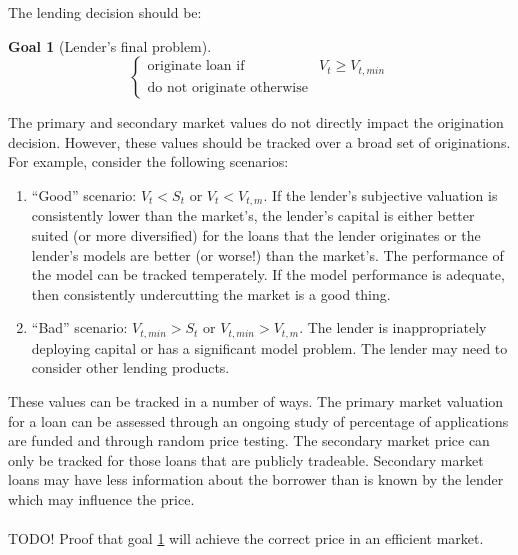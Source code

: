 \documentclass{article}
\theoremstyle{definition}
\newtheorem{goal}{Goal}
\begin{document}
The lending decision should be:


\begin{goal}[Lender's final problem] \label{lender3}
	\[
	\left\{
	\begin{array}{ll}
	\text{originate loan if} & V_t \geq V_{t, min}\\
	\text{do not originate otherwise} 
	\end{array} \right.
	\]
	
\end{goal}

The primary and secondary market values do not directly impact the origination decision.  However, these values should be tracked over a broad set of originations.  For example, consider the following scenarios:

\begin{enumerate}
	\item ``Good'' scenario:  \(V_t<S_t\) or \(V_t<V_{t, m}\).  If the lender's subjective valuation is consistently lower than the market's, the lender's capital is either better suited (or more diversified) for the loans that the lender originates or the lender's models are better (or worse!) than the market's.  The performance of the model can be tracked temperately.  If the model performance is adequate, then consistently undercutting the  market is a good thing.  
	\item ``Bad'' scenario: \(V_{t, min}>S_t\) or \(V_{t, min}>V_{t, m}\).  The lender is inappropriately deploying capital or has a significant model problem.  The lender may need to consider other lending products.  
\end{enumerate}

These values can be tracked in a number of ways.  The primary market valuation for a loan can be assessed through an ongoing study of percentage of applications are funded and through random price testing.  The secondary market price can only be tracked for those loans that are publicly tradeable.  Secondary market loans may have less information about the borrower than is known by the lender which may influence the price.  
\\
\\
TODO! Proof that goal \ref{lender3} will achieve the correct price in an efficient market.  
\end{document}
